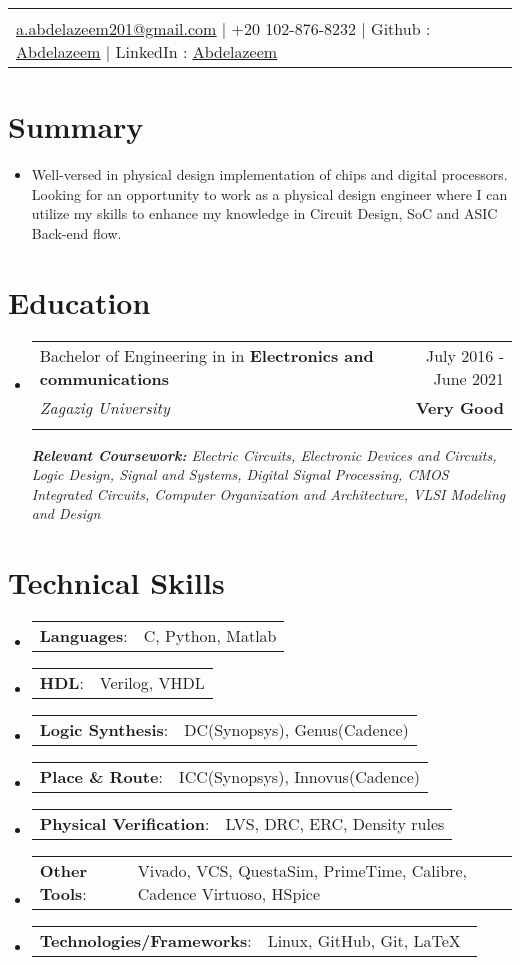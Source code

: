 \documentclass[letterpaper,11pt]{article}
\makeatletter
\newcommand{\sectionStart}{
  \begin{itemize}[label={},leftmargin=0in]
}
\newcommand{\sectionEnd}{
  \end{itemize}
}
\newcommand{\head}[9]{
  \noindent
  \begin{tabular*}{\textwidth}{l@{\extracolsep{\fill}}r}
    \centerline{
      \textbf{\href{#1}{\color{black}{\LARGE {\underline{#2}}}}}
    }
    \vspace{5pt}\\
    \centerline{
      \href{mailto:#3}{\underline{#3}} $\mid$
      #4 $\mid$
      #5 : \href{#6}{\underline{#7}} $\mid$
      #8 : \href{#9}{\underline{#7}}
    }
  \end{tabular*}
  \vspace{-10pt}
}
\newcommand{\summaryText}[1]{
  \item
  \begin{addmargin}[7pt]{0pt}
    {#1}
  \end{addmargin}
}
\newcommand{\educationItem}[5]{
  \vspace{-1pt}
  \item
  \begin{tabular*}{\textwidth}{l@{\extracolsep{\fill}}r@{}}
    {#1 in \textbf{#2}}  & {#3}\\
    {\textit{#4}} & {#5}\\\vspace{-18pt}
  \end{tabular*}
  \vspace{-5pt}
}
\newcommand{\skillItem}[2]{
  \vspace{-1pt}
  \item
  \begin{tabular*}{1.0\textwidth}{l@{}l@{}}
    {\textbf{#1}: } & {#2}
  \end{tabular*}\vspace{-17pt}
}
\makeatother
\begin{document}
\head
  {https://abdelazeem201.github.io/}
  {Ahmed Abdelazeem}
  {a.abdelazeem201@gmail.com}
  {+20 102-876-8232}
  {Github}
  {https://github.com/abdelazeem201}
  {Abdelazeem}
  {LinkedIn}
  {https://www.linkedin.com/in/ahmed-abdelazeem/}

\section{Summary}
\sectionStart
  \summaryText
  {Well-versed in physical design implementation of chips and digital processors. Looking for an opportunity to
  	work as a physical design engineer where I can utilize my skills to enhance my knowledge in Circuit Design, SoC
  	and ASIC Back-end flow.}
\sectionEnd

\section{Education}
\sectionStart
  \educationItem
    {Bachelor of Engineering in } 
    {Electronics and communications} 
    {July 2016 - June 2021}
    {Zagazig University} 
    {\textbf{Very Good}}
    {\scriptsize \textit{ \footnotesize{\newline{}\textbf{Relevant Coursework:} Electric Circuits, Electronic Devices and Circuits, Logic Design, Signal and Systems, Digital Signal Processing, CMOS Integrated Circuits, Computer Organization and Architecture, VLSI Modeling and Design}}}
\sectionEnd

\section{Technical Skills}
\sectionStart
\skillItem
{Languages}
{C, Python, Matlab}
\skillItem
{HDL}
{Verilog, VHDL}
   \skillItem
{Logic Synthesis}
{DC(Synopsys), Genus(Cadence)}
 \skillItem
{Place \& Route}
{ICC(Synopsys), Innovus(Cadence)}  
    \skillItem
{Physical Verification}
{LVS, DRC, ERC, Density rules}
\skillItem
{Other Tools}
{Vivado, VCS, QuestaSim, PrimeTime, Calibre, Cadence Virtuoso, HSpice}
\skillItem
{Technologies/Frameworks}
{Linux, GitHub, Git, \LaTeX\ }
\vspace{3pt}
\sectionEnd

\end{document}
